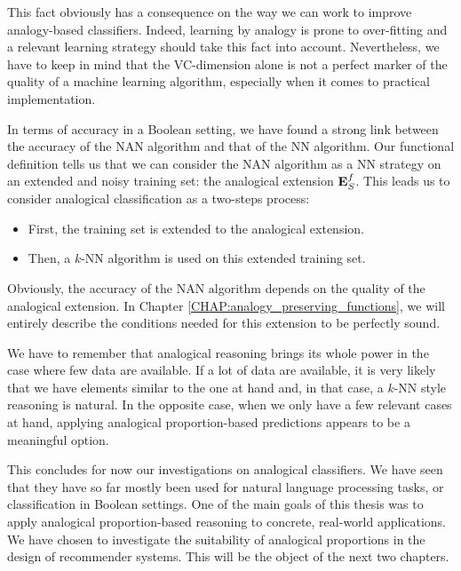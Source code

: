 This fact obviously has a consequence on the way we can work to improve
analogy-based classifiers.  Indeed, learning by analogy is prone to
over-fitting and a relevant learning strategy should take this fact into
account.  Nevertheless, we have to keep in mind that the VC-dimension alone is
not a perfect marker of the quality of a machine learning algorithm, especially
when it comes to practical implementation.

In terms of accuracy in a Boolean setting, we have found a strong link between
the accuracy of the NAN algorithm and that of the NN algorithm. Our functional
definition tells us that we can consider the NAN algorithm as a NN strategy on an
extended and noisy training set: the analogical extension $\mathbf{E}_{S}^{f}$. This leads us
to consider analogical classification as a two-steps process:
\begin{itemize}
  \item First, the training set is extended to the analogical extension.
  \item Then, a $k$-NN algorithm is used on this extended training set.
\end{itemize}
Obviously, the accuracy of the NAN algorithm depends on the quality of the
analogical extension. In Chapter \ref{CHAP:analogy_preserving_functions}, we
will entirely describe the conditions needed for this extension to be perfectly
sound.

We have to remember that analogical reasoning brings its whole power in the
case where few data are available. If a lot of data are available, it is very
likely that we have elements similar to the one at hand and, in that case, a
$k$-NN style reasoning is natural. In the opposite case, when we only have a
few relevant cases at hand, applying analogical proportion-based predictions
appears to be a meaningful option.

This concludes for now our investigations on analogical classifiers. We have
seen that they have so far mostly been used for natural language processing
tasks, or classification in Boolean settings. One of the main goals of this
thesis was to apply analogical proportion-based reasoning to concrete,
real-world applications. We have chosen to investigate the suitability of
analogical proportions in the design of recommender systems. This will be the
object of the next two chapters.


